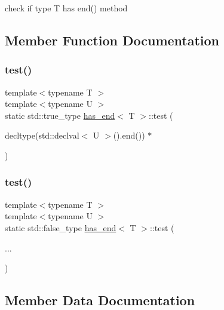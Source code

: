 check if type T has \textquotesingle{}end()\textquotesingle{} method 

\subsection{Member Function Documentation}
\mbox{\label{structhas__end_aa7f205d85237693f6d331008ca208caa}} 
\subsubsection{\texorpdfstring{test()}{test()}\hspace{0.1cm}{\footnotesize\ttfamily [1/2]}}
{\footnotesize\ttfamily template$<$typename T $>$ \\
template$<$typename U $>$ \\
static std\+::true\+\_\+type \hyperlink{structhas__end}{has\+\_\+end}$<$ T $>$\+::test (\begin{DoxyParamCaption}\item[{decltype(std\+::declval$<$ U $>$().end()) $\ast$}]{ }\end{DoxyParamCaption})\hspace{0.3cm}{\ttfamily [static]}}

\mbox{\label{structhas__end_a7271796b8a3415685dd533aee13f9619}} 
\subsubsection{\texorpdfstring{test()}{test()}\hspace{0.1cm}{\footnotesize\ttfamily [2/2]}}
{\footnotesize\ttfamily template$<$typename T $>$ \\
template$<$typename U $>$ \\
static std\+::false\+\_\+type \hyperlink{structhas__end}{has\+\_\+end}$<$ T $>$\+::test (\begin{DoxyParamCaption}\item[{}]{... }\end{DoxyParamCaption})\hspace{0.3cm}{\ttfamily [static]}}



\subsection{Member Data Documentation}
\mbox{\label{structhas__end_ae73ed670937d854009087106a4c181a4}} 
